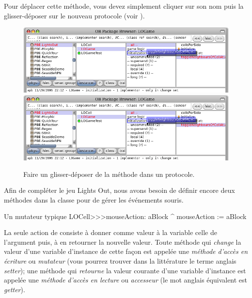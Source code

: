 \documentclass[a4paper,10pt,twoside]{book}
\begin{document}
Pour déplacer cette méthode, vous devez simplement cliquer sur son nom
puis la glisser-déposer sur le nouveau protocole (voir ).

\begin{figure}[htbp]
   \centering
   \ifluluelse
		{\includegraphics[width=\textwidth]{DragMethod} }
		{\includegraphics[scale=0.7]{DragMethod} }
   \caption{Faire un glisser-déposer de la méthode dans un protocole.}
\end{figure}

Afin de compléter le jeu Lights Out, nous avons besoin de définir encore deux méthodes dans la classe  pour de gérer les événements souris.
\begin{method}[mouseAction:]{Un mutateur typique}
LOCell>>>mouseAction: aBlock
   ^ mouseAction := aBlock
\end{method}

La seule action de  consiste à donner comme
valeur à la variable  celle de l'argument puis, à en
retourner la nouvelle valeur. Toute méthode qui \emph{change} la
valeur d'une variable d'instance de cette façon est appelée une
\emph{méthode d'accès en écriture} ou \emph{mutateur} (vous pourrez
trouver dans la littérature le terme anglais \emph{setter}); une
méthode qui \emph{retourne} la valeur courante d'une variable
d'instance est appelée une \emph{méthode d'accès en lecture} ou
\emph{accesseur} (le mot anglais équivalent est \emph{getter}).
\end{document}
